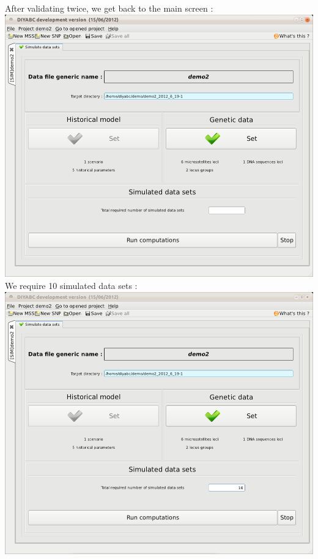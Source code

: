 After validating twice, we get back to the main screen :\\ 

\includegraphics[scale=0.33]{gui_pictures/Capture-DIYABC-84.png} \\

We require 10 simulated data sets :\\

\includegraphics[scale=0.33]{gui_pictures/Capture-DIYABC-85.png} \\

